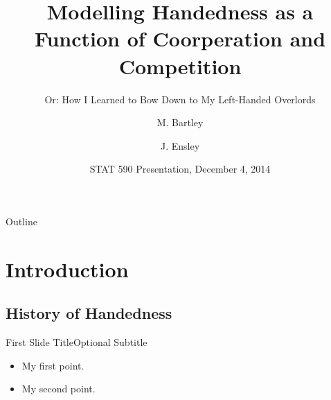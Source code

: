 \documentclass{beamer}
\title{Modelling Handedness as a Function of Coorperation and Competition}
\subtitle{Or: How I Learned to Bow Down to My Left-Handed Overlords}
\author{M. Bartley\inst{1} \and J. Ensley\inst{1}}
\institute[The Pennsylvania State University] %
{
  \inst{1}%
  Department of Statistics\\
  The Pennsylvania State University
  }
\date{STAT 590 Presentation, December 4, 2014}
\begin{document}
\begin{frame}
  \titlepage
\end{frame}

\begin{frame}{Outline}
  \tableofcontents
\end{frame}

\section{Introduction}

    \subsection{History of Handedness}

    \begin{frame}{First Slide Title}{Optional Subtitle}
      \begin{itemize}
      \item {
        My first point.
      }
      \item {
        My second point.
      }
      \end{itemize}
    \end{frame}


\end{document}
